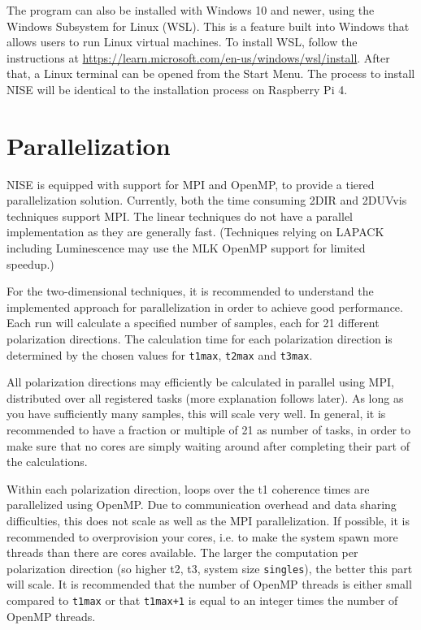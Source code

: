 \documentclass[12pt]{book}
\begin{document}
The program can also be installed with Windows 10 and newer, using the Windows Subsystem for Linux (WSL). This is a feature built into Windows that allows users to run Linux virtual machines. To install WSL, follow the instructions at \url{https://learn.microsoft.com/en-us/windows/wsl/install}. After that, a Linux terminal can be opened from the Start Menu. The process to install NISE will be identical to the installation process on Raspberry Pi 4.

\section{Parallelization}
NISE is equipped with support for MPI and OpenMP, to provide a tiered parallelization solution. Currently, both the time consuming 2DIR and 2DUVvis techniques support MPI. The linear techniques do not have a parallel implementation as they are generally fast. (Techniques relying on LAPACK including Luminescence may use the MLK OpenMP support for limited speedup.)

For the two-dimensional techniques, it is recommended to understand the implemented approach for parallelization in order to achieve good performance. Each run will calculate a specified number of samples, each for 21 different polarization directions. The calculation time for each polarization direction is determined by the chosen values for {\tt t1max}, {\tt t2max} and {\tt t3max}.

All polarization directions may efficiently be calculated in parallel using MPI, distributed over all registered tasks (more explanation follows later). As long as you have sufficiently many samples, this will scale very well. In general, it is recommended to have a fraction or multiple of 21 as number of tasks, in order to make sure that no cores are simply waiting around after completing their part of the calculations.

Within each polarization direction, loops over the t1 coherence times are parallelized using OpenMP. Due to communication overhead and data sharing difficulties, this does not scale as well as the MPI parallelization. If possible, it is recommended to overprovision your cores, i.e. to make the system spawn more threads than there are cores available. The larger the computation per polarization direction (so higher t2, t3, system size {\tt singles}), the better this part will scale. It is recommended that the number of OpenMP threads is either small compared to {\tt t1max} or that {\tt t1max+1} is equal to an integer times the number of OpenMP threads.
\end{document}
